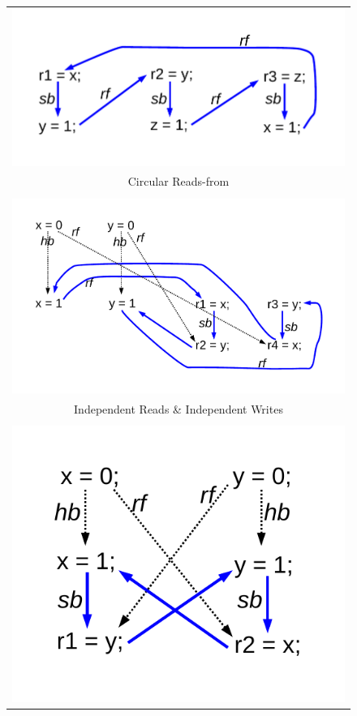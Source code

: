 \begin{figure}[!ht]
\centering
\begin{tabular}{c}
\includegraphics[scale=.45]{figures/examples/circular_rf}\\
Circular Reads-from\\
\hline\\
\includegraphics[scale=.45]{figures/examples/iriw}\\
Independent Reads \& Independent Writes\\
\hline\\
\includegraphics[scale=.45]{figures/examples/peterson_lock}\\

\end{tabular}
\end{figure}

